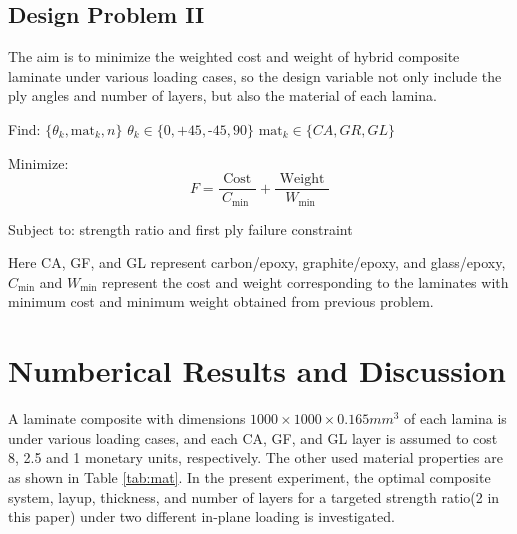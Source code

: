 \documentclass[USenglish]{article}
\begin{document}
\subsection{Design Problem II}
The aim is to minimize the weighted cost and weight of hybrid composite
laminate under various loading cases, so the design variable not only include
the ply angles and number of layers, but also the material of each lamina. 


Find: $\{\theta_k,\text{mat}_k, n\}$ $\theta_k \in \{ 0,\text{+}45,\text{-}45,90\}$ $\text{mat}_k \in \{CA, GR, GL \}$

Minimize: 
\begin{equation}
	F=\frac{\text { Cost }}{C_{\text {min }}}+\frac{\text { Weight }}{W_{\text {min }}}
\end{equation}

Subject to: strength ratio and first ply failure constraint


Here CA, GF, and GL represent carbon/epoxy, graphite/epoxy, and glass/epoxy,
 $C_{\text{min}}$ and $W_{\text{min}}$ represent the cost and
weight corresponding to the laminates with minimum cost and minimum weight
obtained from previous problem.

\section{Numberical Results and Discussion}
A laminate composite with dimensions $1000 \times 1000 \times 0.165 mm^3$ of
each lamina is under various loading cases, and each CA, GF, and GL layer is
assumed to cost 8, 2.5 and 1 monetary units, respectively.  The other used
material properties are as shown in Table \ref{tab:mat}.  In the present
experiment,  the optimal composite system, layup, thickness, and number of
layers for a targeted strength ratio(2 in this paper) under two different
in-plane loading is investigated.
\end{document}

